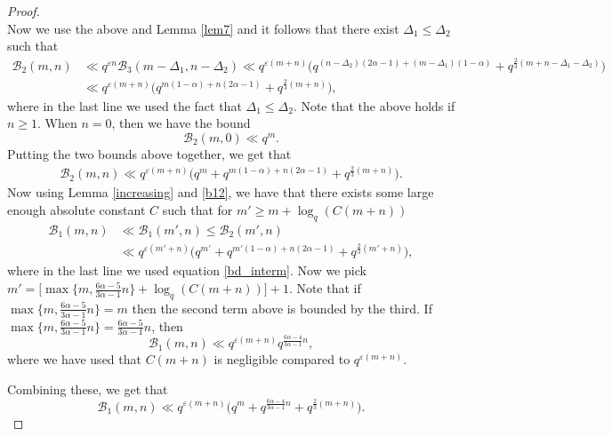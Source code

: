 \documentclass[12pt]{amsart}
\begin{document}
\begin{proof}
\begin{equation*}
\end{equation*}
Now we use the above and Lemma \ref{lem7} and it follows that there exist $\Delta_1 \leq \Delta_2$ such that 
\begin{align*}
\mathcal{B}_2(m,n) &\ll q^{\varepsilon n} \mathcal{B}_3(m-\Delta_1, n - \Delta_2) \ll q^{\varepsilon(m+n)} \Big(  q^{(n-\Delta_2)(2\alpha-1)+(m-\Delta_1)(1-\alpha)} + q^{\frac{2}{3} (m+n-\Delta_1-\Delta_2)}\Big) \\
& \ll q^{\varepsilon(m+n)} \Big(q^{m(1-\alpha)+n(2\alpha-1)} + q^{\frac{2}{3} (m+n)} \Big),
\end{align*}
where in the last line we used the fact that $\Delta_1 \leq \Delta_2$. Note that the above holds if $n \geq 1$. When $n=0$, then we have the bound
$$ \mathcal{B}_2(m,0) \ll q^{m}.$$
Putting the two bounds above together, we get that
\begin{align}
\label{bd_interm}
\mathcal{B}_2(m,n) \ll q^{\varepsilon(m+n)} \Big(q^m+ q^{m(1-\alpha)+n(2\alpha-1)} + q^{\frac{2}{3} (m+n)} \Big).
\end{align}
Now using Lemma \ref{increasing} and \eqref{b12}, we have that there exists some large enough absolute constant $C$  such that for $m' \geq m+\log_q(C(m+n))$
\begin{align*}
\mathcal{B}_1(m,n) &\ll \mathcal{B}_1(m',n) \leq \mathcal{B}_2(m',n) \\
& \ll q^{\varepsilon(m'+n)} \Big(q^{m'}+ q^{m'(1-\alpha)+n(2\alpha-1)} + q^{\frac{2}{3} (m'+n)} \Big),
\end{align*}
where in the last line we used equation \eqref{bd_interm}. Now we pick
$m' =  \Big[ \max \{ m, \frac{6\alpha-5}{3\alpha-1} n\}+\log_q(C(m+n)) \Big]+1$. Note that if $\max \{ m, \frac{6\alpha-5}{3\alpha-1} n\}= m$ then the second term above is bounded by the third. If $\max \{ m, \frac{6\alpha-5}{3\alpha-1} n\}= \frac{6\alpha-5}{3\alpha-1}n$, then
$$\mathcal{B}_1(m,n) \ll q^{\varepsilon(m+n)} q^{ \frac{6\alpha-4}{3\alpha-1}n},$$
where we have used that $C(m+n)$ is negligible compared to $q^{\varepsilon (m+n)}$.

Combining these, we get that
$$ \mathcal{B}_1(m,n) \ll q^{\varepsilon(m+n)} \Big(q^m+q^{ \frac{6\alpha-4}{3\alpha-1}n}+q^{\frac{2}{3} (m+n)} \Big).$$
\end{proof} 
\end{document}
